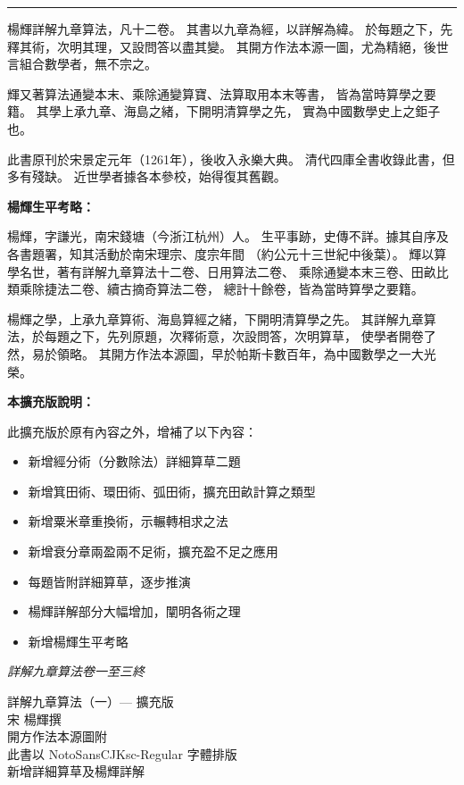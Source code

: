 \documentclass[11pt,a4paper]{article}
\begin{document}
\begin{center}
\rule{0.5\textwidth}{0.4pt}
\end{center}

楊輝詳解九章算法，凡十二卷。
其書以九章為經，以詳解為緯。
於每題之下，先釋其術，次明其理，又設問答以盡其變。
其開方作法本源一圖，尤為精絕，後世言組合數學者，無不宗之。

輝又著算法通變本末、乘除通變算寶、法算取用本末等書，
皆為當時算學之要籍。
其學上承九章、海島之緒，下開明清算學之先，
實為中國數學史上之鉅子也。

此書原刊於宋景定元年（1261年），後收入永樂大典。
清代四庫全書收錄此書，但多有殘缺。
近世學者據各本參校，始得復其舊觀。

\textbf{楊輝生平考略：}

楊輝，字謙光，南宋錢塘（今浙江杭州）人。
生平事跡，史傳不詳。據其自序及各書題署，知其活動於南宋理宗、度宗年間
（約公元十三世紀中後葉）。
輝以算學名世，著有詳解九章算法十二卷、日用算法二卷、
乘除通變本末三卷、田畝比類乘除捷法二卷、續古摘奇算法二卷，
總計十餘卷，皆為當時算學之要籍。

楊輝之學，上承九章算術、海島算經之緒，下開明清算學之先。
其詳解九章算法，於每題之下，先列原題，次釋術意，次設問答，次明算草，
使學者開卷了然，易於領略。
其開方作法本源圖，早於帕斯卡數百年，為中國數學之一大光榮。

\textbf{本擴充版說明：}

此擴充版於原有內容之外，增補了以下內容：
\begin{itemize}[leftmargin=2em]
\item 新增經分術（分數除法）詳細算草二題
\item 新增箕田術、環田術、弧田術，擴充田畝計算之類型
\item 新增粟米章重換術，示輾轉相求之法
\item 新增衰分章兩盈兩不足術，擴充盈不足之應用
\item 每題皆附詳細算草，逐步推演
\item 楊輝詳解部分大幅增加，闡明各術之理
\item 新增楊輝生平考略
\end{itemize}

\begin{flushright}
\textit{詳解九章算法卷一至三終}
\end{flushright}

\vfill

\begin{center}
{\small 詳解九章算法（一）--- 擴充版\\
宋 楊輝撰\\
開方作法本源圖附\\
此書以 NotoSansCJKsc-Regular 字體排版\\
新增詳細算草及楊輝詳解}
\end{center}
\end{document}
